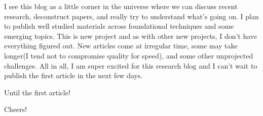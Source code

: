 \documentclass[
  letterpaper,
  DIV=11,
  numbers=noendperiod]{scrartcl}
\begin{document}
I see this blog as a little corner in the universe where we can discuss
recent research, deconstruct papers, and really try to understand what's
going on. I plan to publish well studied materials across foundational
techniques and some emerging topics. This is new project and as with
other new projects, I don't have everything figured out. New articles
come at irregular time, some may take longer(I tend not to compromise
quality for speed), and some other unprojected challenges. All in all, I
am super excited for this research blog and I can't wait to publish the
first article in the next few days.

Until the first article!

Cheers!
\end{document}
